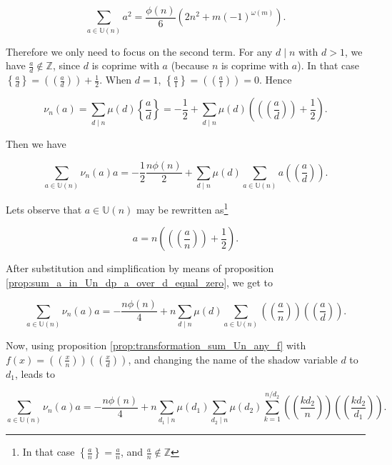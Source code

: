 \documentclass[a4paper,12pt]{article}
\newcommand{\FP}[1]{\left\{ #1 \right\}}
\newcommand{\setU}[1]{\mathbb{U}\left( #1 \right)}
\newcommand{\doubleparii}[1]{\left(\!\!\left(#1\right)\!\!\right)}
\newcommand{\doublepari}[1]{\left(\!\left(#1\right)\!\right)}
\begin{document}
\begin{equation}
\sum_{a\in \setU{n}}a^2 = \frac{\phi(n)}{6}\left( 2 n^2 + m (-1)^{\omega(m)} \right).
\label{eq:formula_sum_ainUn_a2}
\end{equation}

Therefore we only need to focus on the second term. For any $d \mid n$ with $d>1$, we have $\frac{a}{d}\notin \mathbb{Z}$, since $d$ is coprime with $a$ (because $n$ is coprime with $a$). In that case $\left\{\frac{a}{d}\right\}=\doublepari{\frac{a}{d}}+\frac{1}{2}$. When $d=1$, $\left\{\frac{a}{1}\right\}=\doublepari{\frac{a}{1}}=0$. 
Hence

\begin{equation*}
\nu_n(a) = \sum_{d\mid n}\mu(d)\left\{\frac{a}{d}\right\} = -\frac{1}{2} + \sum_{d\mid n}\mu(d)\left(\doubleparii{\frac{a}{d}}+\frac{1}{2}\right).
\end{equation*}

Then we have

\begin{equation*}
\sum_{a\in \setU{n}}\nu_n(a)a = -\frac{1}{2}\frac{n\phi(n)}{2}+\sum_{d\mid n}\mu(d)\sum_{a\in \setU{n}} a\doubleparii{\frac{a}{d}}.
\end{equation*}

Lets observe that $a\in \setU{n}$ may be rewritten as\footnote{In that case $\FP{\frac{a}{n}}=\frac{a}{n}$, and $\frac{a}{n}\notin \mathbb{Z}$}

\begin{equation*}
a = n\left(\doubleparii{\frac{a}{n}}+\frac{1}{2}\right).
\end{equation*}

After substitution and simplification by means of proposition \ref{prop:sum_a_in_Un_dp_a_over_d_equal_zero}, we get to

\begin{equation*}
\sum_{a\in \setU{n}}\nu_n(a)a = -\frac{n\phi(n)}{4}+n\sum_{d\mid n}\mu(d)\sum_{a\in \setU{n}} \doubleparii{\frac{a}{n}}\doubleparii{\frac{a}{d}}.
\end{equation*}

Now, using proposition \ref{prop:transformation_sum_Un_any_f} with $f(x)=\doublepari{\frac{x}{n}}\doublepari{\frac{x}{d}}$, and changing the name of the shadow variable $d$ to $d_1$, leads to

\begin{equation*}
\sum_{a\in \setU{n}}\nu_n(a)a = -\frac{n\phi(n)}{4} + n \sum_{d_1\mid n}\mu(d_1) \sum_{d_2\mid n}\mu(d_2)\sum_{k=1}^{n/d_2} \doubleparii{\frac{kd_2}{n}}\doubleparii{\frac{kd_2}{d_1}}.
\end{equation*}
\end{document}
